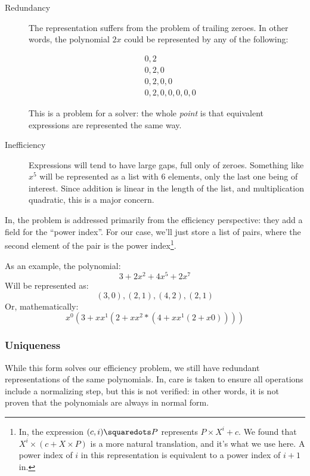 \documentclass[draft, twocolumn]{article}
\theoremstyle{definition}
\begin{document}
\begin{description}
  \item[Redundancy] The representation suffers from the problem of trailing
    zeroes. In other words, the polynomial $2x$ could be represented by any of
    the following:
  
    \begin{align*}
      & 0, 2 \\
      & 0, 2, 0 \\
      & 0, 2, 0, 0 \\
      & 0, 2, 0, 0, 0, 0, 0
    \end{align*}
    
    This is a problem for a solver: the whole \emph{point} is that equivalent
    expressions are represented the same way.

  \item[Inefficiency] Expressions will tend to have large gaps, full only of
    zeroes. Something like $x^5$ will be represented as a list with 6 elements,
    only the last one being of interest. Since addition is linear in the length
    of the list, and multiplication quadratic, this is a major concern.
\end{description}

In\cite{hutchison_proving_2005}, the problem is addressed primarily from the
efficiency perspective: they add a field for the ``power index''. For our case,
we'll just store a list of pairs, where the second element of the pair is the
power index\footnote{
  In\cite{hutchison_proving_2005}, the expression \((c , i) \squaredots P\)
  represents \(P \times X^i + c\). We found that \(X^i \times (c + X \times P)\)
  is a more natural translation, and it's what we use here. A power index of
  \(i\) in this representation is equivalent to a power index of \(i+1\)
  in\cite{hutchison_proving_2005}.
}.

As an example, the polynomial:
\[ 3 + 2x^2 + 4x^5 + 2x^7 \]
Will be represented as:
\[ (3,0),(2,1),(4,2),(2,1) \]
Or, mathematically:
\[ x^0 (3 + x x^1 (2 + x x^2 * (4 + x x^1 (2 + x 0)))) \]
\subsubsection{Uniqueness}
While this form solves our efficiency problem, we still have redundant
representations of the same polynomials. In\cite{hutchison_proving_2005}, care
is taken to ensure all operations include a normalizing step, but this is not
verified: in other words, it is not proven that the polynomials are always in
normal form.
\end{document}
